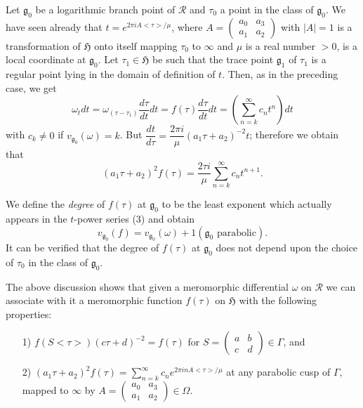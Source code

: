 Let $\mathfrak{g}_0$ be a logarithmic branch point of $\mathscr{R}$
and $\tau_0$ a point in the class of $\mathfrak{g}_0$. We have seen
already that $t=e^{2\pi i A <\tau>/\mu}$, where
$A=\left(\begin{smallmatrix} a_0&a_3\\a_1 & a_2
\end{smallmatrix}\right)$ with $|A|=1$ is a transformation of
$\mathfrak{H}$ onto itself mapping $\tau_0$ to $\infty$ and $\mu$ is a
real number $>0$, is a local coordinate at $\mathfrak{g}_0$. Let
$\tau_1\in \mathfrak{H}$ be such that the trace point
$\mathfrak{g}_1$ of $\tau_1$ is a regular point lying in the domain of
definition of $t$. Then, as in the preceding case, we get
$$
\omega_t dt = \omega_{(\tau-\tau_1)} \frac{d\tau}{dt} dt = f(\tau)
\frac{d\tau}{dt} dt = \left(\sum^{\infty}_{n=k} c_n t^n\right) dt
$$\pageoriginale
with $c_k \neq 0$ if $v_{\mathfrak{g}_0}(\omega)=k$. But
$\dfrac{dt}{d\tau} =\dfrac{2\pi i}{\mu} (a_1 \tau+a_2)^{-2}t$;
therefore we obtain that 
\begin{equation*}
(a_1\tau+a_2)^2 f(\tau) =\frac{2\tau i}{\mu} \sum^{\infty}_{n=k} c_n
  t^{n+1}. \tag{1}\label{eq6:1}
\end{equation*}

We define the \textit{degree} of $f(\tau)$ at $\mathfrak{g}_0$ to be
the least exponent which actually appears in the $t$-power series (3)
and obtain
$$
v_{\mathfrak{g}_0}(f)=v_{\mathfrak{g}_0}(\omega)+1 (\mathfrak{g}_0
\text{ parabolic}).
$$
It can be verified that the degree of $f(\tau)$ at $\mathfrak{g}_0$
does not depend upon the choice of $\tau_0$ in the class of $\mathfrak{g}_0$.

The above discussion shows that given a meromorphic differential
$\omega$ on $\mathscr{R}$ we can associate with it a meromorphic
function $f(\tau)$ on $\mathfrak{H}$ with the following properties:
\begin{itemize}
\item[1)] $f(S<\tau>)(c\tau+d)^{-2} = f(\tau)$ for $S =
  \left(\begin{smallmatrix} a& b\\c & d  \end{smallmatrix}
  \right)\in \Gamma$, and 

\item[2)] $(a_1\tau+a_2)^2 f(\tau) =\sum^{\infty}_{n=k} c_n e^{2 \pi
  in A <\tau>/\mu}$ at any parabolic cusp of $\Gamma$, mapped to
  $\infty$ by $A=\left(\begin{smallmatrix} a_0& a_3\\a_1 & a_2  \end{smallmatrix}
  \right) \in \Omega$.
\end{itemize}

